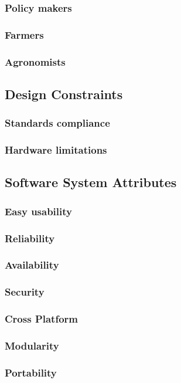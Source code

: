 \subsubsection{Policy makers}
\label{sect:policy_maker_requirements}



\subsubsection{Farmers}
\label{sect:farmer_requirements}


\subsubsection{Agronomists}
\label{sect:agronomist_requirements}




\subsection{Design Constraints}
\subsubsection{Standards compliance}
\subsubsection{Hardware limitations}

\subsection{Software System Attributes}
\subsubsection{Easy usability}
\subsubsection{Reliability}
\subsubsection{Availability}
\subsubsection{Security}
\subsubsection{Cross Platform}
\subsubsection{Modularity}
\subsubsection{Portability}